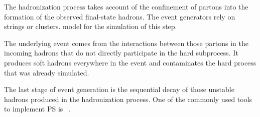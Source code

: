 The hadronization process takes account of the confinement of partons into the formation of the observed final-state hadrons. The event generators rely on strings or clusters. model for the simulation of this step. 

The underlying event comes from the interactions between those partons in the incoming hadrons that do not directly participate in the hard subprocess. It produces soft hadrons everywhere in the event and contaminates the hard process that was already simulated. 

The last stage of event generation is the sequential decay of those unstable hadrons produced in the hadronization process. One of the commonly used tools to implement \ac{PS} is \PY~\cite{Sjostrand:2014zea}.